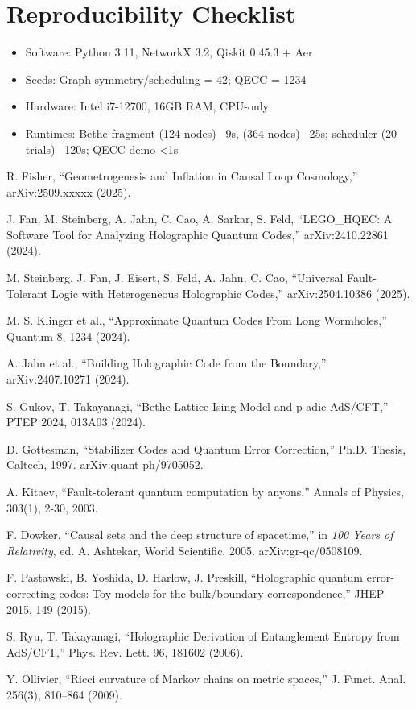 \documentclass[11pt, a4paper]{article}
\begin{document}
\section*{Reproducibility Checklist}
\begin{itemize}
  \item Software: Python 3.11, NetworkX 3.2, Qiskit 0.45.3 + Aer
  \item Seeds: Graph symmetry/scheduling = 42; QECC = 1234
  \item Hardware: Intel i7-12700, 16GB RAM, CPU-only
  \item Runtimes: Bethe fragment (124 nodes) ~9s, (364 nodes) ~25s; scheduler (20 trials) ~120s; QECC demo <1s
\end{itemize}

\begin{thebibliography}{99}
R. Fisher, ``Geometrogenesis and Inflation in Causal Loop Cosmology,'' arXiv:2509.xxxxx (2025).

J. Fan, M. Steinberg, A. Jahn, C. Cao, A. Sarkar, S. Feld, ``LEGO_HQEC: A Software Tool for Analyzing Holographic Quantum Codes,'' arXiv:2410.22861 (2024).

M. Steinberg, J. Fan, J. Eisert, S. Feld, A. Jahn, C. Cao, ``Universal Fault-Tolerant Logic with Heterogeneous Holographic Codes,'' arXiv:2504.10386 (2025).

M. S. Klinger et al., ``Approximate Quantum Codes From Long Wormholes,'' Quantum 8, 1234 (2024).

A. Jahn et al., ``Building Holographic Code from the Boundary,'' arXiv:2407.10271 (2024).

S. Gukov, T. Takayanagi, ``Bethe Lattice Ising Model and p-adic AdS/CFT,'' PTEP 2024, 013A03 (2024).

D. Gottesman, ``Stabilizer Codes and Quantum Error Correction,'' Ph.D. Thesis, Caltech, 1997. arXiv:quant-ph/9705052.

A. Kitaev, ``Fault-tolerant quantum computation by anyons,'' Annals of Physics, 303(1), 2-30, 2003.

F. Dowker, ``Causal sets and the deep structure of spacetime,'' in \textit{100 Years of Relativity}, ed. A. Ashtekar, World Scientific, 2005. arXiv:gr-qc/0508109.

F. Pastawski, B. Yoshida, D. Harlow, J. Preskill, ``Holographic quantum error-correcting codes: Toy models for the bulk/boundary correspondence,'' JHEP 2015, 149 (2015).

S. Ryu, T. Takayanagi, ``Holographic Derivation of Entanglement Entropy from AdS/CFT,'' Phys. Rev. Lett. 96, 181602 (2006).

Y. Ollivier, ``Ricci curvature of Markov chains on metric spaces,'' J. Funct. Anal. 256(3), 810–864 (2009).
\end{thebibliography}
\end{document}
